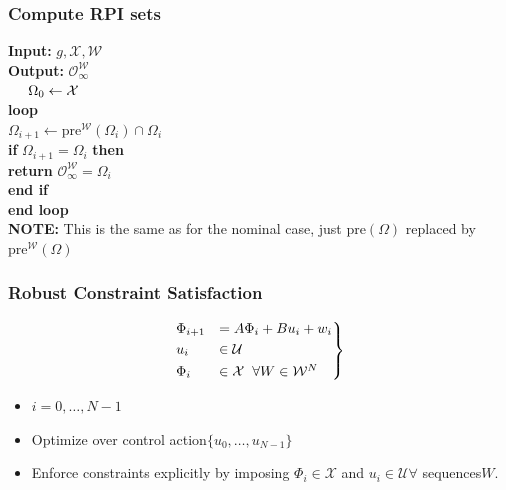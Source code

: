     \subsubsection{Compute RPI sets}
    \textbf{Input: }$g,\mathcal{X,W}$\\
    \textbf{Output: }$\mathcal{O}^\mathcal{W}_\infty$\\
        $\hspace*{5mm} \Omega_0 \leftarrow \mathcal{X}$\\
         \hspace*{5mm}\textbf{loop}\\
         \hspace*{8mm}$\Omega_{i+1} \leftarrow \textrm{pre}^\mathcal{W}(\Omega_i) \cap\Omega_i$\\
         \hspace*{8mm}\textbf{if }$\Omega_{i+1} = \Omega_i$ \textbf{then}\\
         \hspace*{10mm}\textbf{return} $\mathcal{O} ^\mathcal{W}_\infty = \Omega_i$\\
         \hspace*{8mm}\textbf{end if}\\
         \hspace*{5mm}\textbf{end loop}\\
    \textbf{NOTE:} This is the same as for the nominal case, just $\mathrm{pre}(\Omega)$ replaced by $\mathrm{pre}^\mathcal{W}(\Omega)$
    \subsubsection{Robust Constraint Satisfaction}
    \begin{minipage}{0.22\linewidth}
        \begin{align*}
        \begin{rcases}
            \Phi_{i+1} &= A\Phi_i+Bu_i + w_i\\
            u_i &\in \mathcal{U}\\
            \Phi_i &\in \mathcal{X}\hspace{2mm}\forall W \in \mathcal{W}^N
        \end{rcases}
        \end{align*}
    \end{minipage}
    \begin{minipage}{0.6\linewidth}
         \begin{itemize}
             \item $i=0,\dots,N-1$
             \item Optimize over control action$\{u_0,\dots,u_{N-1}\}$
             \item Enforce constraints explicitly by imposing $\Phi_i\in\mathcal{X}$ and $u_i\in \mathcal{U}\forall$ sequences$W$.
         \end{itemize}
    \end{minipage}
    
